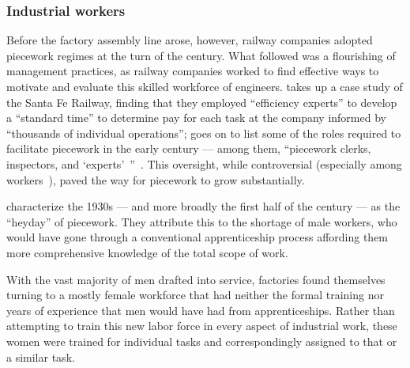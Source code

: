 \documentclass[trackingWork]{subfiles}
\begin{document}
\subsubsection{Industrial workers}
Before the factory assembly line arose, however, railway companies adopted piecework regimes at the turn of the  century.
What followed was a flourishing of management practices,
as railway companies worked to find effective ways
to motivate and evaluate this skilled workforce of engineers.
\citeauthor{10.2307/23702539} takes up a case study of the Santa Fe Railway,
finding that they employed ``efficiency experts'' to develop a ``standard time''
to determine pay for each task at the company informed by
``thousands of individual operations'';
\citeauthor{10.2307/23702539} goes on to list
some of the roles required to facilitate piecework
in the early  century
--- among them, ``piecework clerks, inspectors, and `experts'~''~\cite{10.2307/23702539}.
This oversight, while controversial
(especially among workers~\cite{american1921problem}),
paved the way for piecework to grow substantially.

\citeauthor{hart2013rise} characterize the 1930s
--- and more broadly the first half of the  century ---
as the ``heyday'' of piecework.
They attribute this to the shortage of male workers,
who would have gone through a conventional apprenticeship process
affording them more comprehensive knowledge of the total scope of work.

With the vast majority of men drafted into service,
factories found themselves turning to
a mostly female workforce that had neither
the formal training nor
years of experience that men would have had from apprenticeships.
Rather than attempting to train this new labor force in every aspect of industrial work,
these women were trained for individual tasks
and correspondingly assigned to that or a similar task.

\begin{comment}
What did I pull from the threads that are related to industrial and railroad workers (i.e. 1920 onward?)

- Graves: railway companies used ``efficiency experts'' to study how long tasks should take
- Hart: evaluation limits complexity (we can affect that with peer evaluation!)
- Graves: sparks of Scientific Management in Piecework
- organization types are important determinants of piecework viability: lots of types of tasks? bad
  - Hart (I think?): variability in *worker* quality is fine
- Foreman is important
- Worker advocacy groups arose to speak out against piecework

\end{comment}
\end{document}

